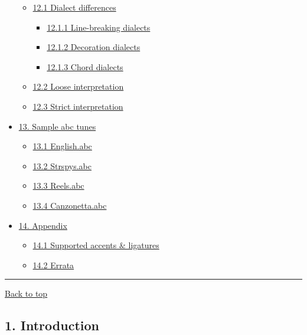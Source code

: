 \begin{itemize}
  \begin{itemize}
  \item
    \protect\hyperlink{dialect_differences}{12.1 Dialect differences}

    \begin{itemize}
    \item
      \protect\hyperlink{line-breaking_dialects}{12.1.1 Line-breaking
      dialects}
    \item
      \protect\hyperlink{decoration_dialects}{12.1.2 Decoration
      dialects}
    \item
      \protect\hyperlink{chord_dialects}{12.1.3 Chord dialects}
    \end{itemize}
  \item
    \protect\hyperlink{loose_interpretation}{12.2 Loose interpretation}
  \item
    \protect\hyperlink{strict_interpretation}{12.3 Strict
    interpretation}
  \end{itemize}
\item
  \protect\hyperlink{sample_abc_tunes}{13. Sample abc tunes}

  \begin{itemize}
  \item
    \protect\hyperlink{englishabc}{13.1 English.abc}
  \item
    \protect\hyperlink{strspysabc}{13.2 Strspys.abc}
  \item
    \protect\hyperlink{reelsabc}{13.3 Reels.abc}
  \item
    \protect\hyperlink{canzonettaabc}{13.4 Canzonetta.abc}
  \end{itemize}
\item
  \protect\hyperlink{appendix}{14. Appendix}

  \begin{itemize}
  \item
    \protect\hyperlink{supported_accents_ligatures}{14.1 Supported
    accents \& ligatures}
  \item
    \protect\hyperlink{errata}{14.2 Errata}
  \end{itemize}
\end{itemize}

\begin{center}\rule{0.5\linewidth}{\linethickness}\end{center}

\protect\hyperlink{}{Back to top}

\hypertarget{introduction}{\subsection{1.
Introduction}\label{introduction}}

